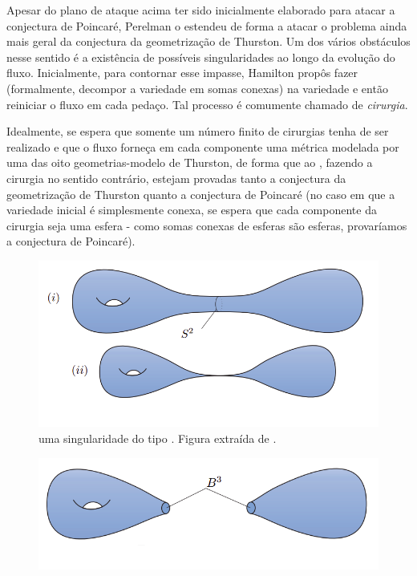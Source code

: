       \begin{oobs}\label{provaPerelman}
        Apesar do plano de ataque acima ter sido inicialmente elaborado para atacar a conjectura de Poincaré, Perelman o estendeu de forma a atacar o problema ainda mais geral da conjectura da geometrização de Thurston. Um dos vários obstáculos nesse sentido é a existência de possíveis singularidades ao longo da evolução do fluxo. Inicialmente, para contornar esse impasse, Hamilton propôs fazer  (formalmente, decompor a variedade em somas conexas) na variedade e então reiniciar o fluxo em cada pedaço. Tal processo é comumente chamado de \emph{cirurgia}. \par 
        Idealmente, se espera que somente um número finito de cirurgias tenha de ser realizado e que o fluxo forneça em cada componente uma métrica modelada por uma das oito geometrias-modelo de Thurston, de forma que ao , fazendo a cirurgia no sentido contrário, estejam provadas tanto a conjectura da geometrização de Thurston quanto a conjectura de Poincaré (no caso em que a variedade inicial é simplesmente conexa, se espera que cada componente da cirurgia seja uma esfera - como somas conexas de esferas são esferas, provaríamos a conjectura de Poincaré). \par 
        \begin{figure}[H]
        \centering
        \includegraphics[scale=.5]{nneck.png}
        \vspace{-1cm}
        \caption{uma singularidade do tipo . Figura extraída de .}
        \end{figure}
        \begin{figure}[H]
        \centering
        \includegraphics[scale=.5]{ccirurgia.png}

\end{figure}
\end{oobs}
